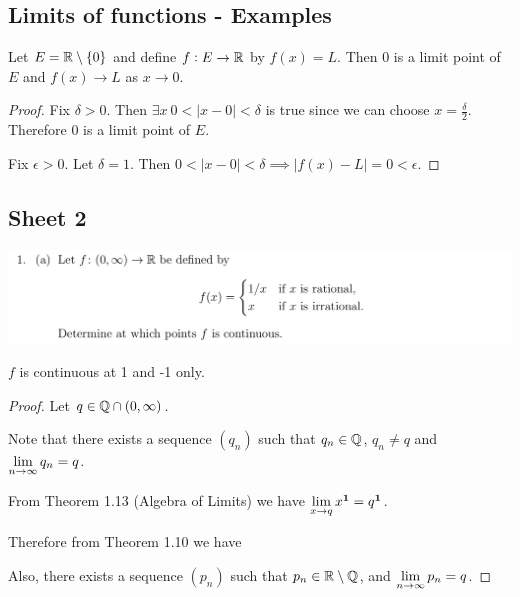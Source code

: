 \subsection{Limits of functions - Examples}

\begin{example}
  Let $E = \R\setminus \{0\}$ and define $f:E \to \R$ by $f(x) = L$. Then 0 is a limit point of
  $E$ and $f(x) \to L$ as $x \to 0$.
\end{example}

\begin{proof}
  Fix $\delta > 0$. Then $\exists x ~ 0 < |x - 0| < \delta$ is true since we can choose
  $x = \frac{\delta}{2}$. Therefore 0 is a limit point of $E$.

  Fix $\epsilon > 0$. Let $\delta = 1$. Then
  $0 < |x - 0| < \delta \implies |f(x) - L| = 0 < \epsilon$.
\end{proof}

\newpage
\subsection{Sheet 2}

\begin{mdframed}
  \includegraphics[width=400pt]{img/oxford-prelims-M2-analysis-II-sheet-2-1a.png}
\end{mdframed}

\begin{theorem*}
  $f$ is continuous at 1 and -1 only.
\end{theorem*}

\begin{proof} Let $q \in \Q \cap (0, \infty)$.

  Note that there exists a sequence $(q_n)$ such that $q_n \in \Q$, $q_n \neq q$ and
  $\LimEq{q_n}{q}{n}{\infty}$.

  From Theorem 1.13 (Algebra of Limits) we have $\Lim{x^\1}{x}{q} = q^\1$.

  Therefore from Theorem 1.10 we have


  Also, there exists a sequence $(p_n)$ such that $p_n \in \R\setminus\Q$, and
  $\LimEq{p_n}{q}{n}{\infty}$.


\end{proof}

